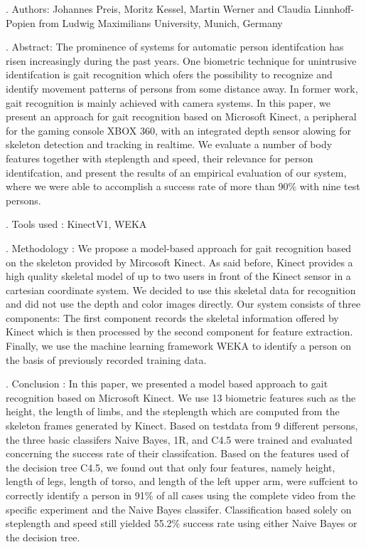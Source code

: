 . Authors:
\noindent Johannes Preis, Moritz Kessel, Martin Werner and Claudia Linnhoff-Popien from Ludwig Maximilians University, Munich, Germany

. Abstract:
\noindent The prominence of systems for automatic person identifcation has risen increasingly during the past years. One biometric technique for unintrusive identifcation is gait recognition which ofers the possibility to recognize and
identify movement patterns of persons from some distance away. In former work, gait recognition is mainly achieved with camera systems. In this paper, we present an approach for gait recognition based on Microsoft Kinect, a peripheral for the gaming console XBOX 360, with an integrated depth
sensor alowing for skeleton detection and tracking in realtime. We evaluate a number of body features together with steplength and speed, their relevance for person identifcation, and present the results of an empirical evaluation of our system, where we were able to accomplish a success rate of more than 90\% with nine test persons.

. Tools used :
\noindent KinectV1, WEKA 

. Methodology :
\noindent We propose a model-based approach for gait recognition based on the skeleton provided by Mircosoft Kinect. As said before, Kinect provides a high quality skeletal model of up to two users in front of the Kinect sensor in a cartesian coordinate system. We decided to use this skeletal data for recognition and did not use the depth and color images directly. Our system consists of three components: The first component records the skeletal information offered by Kinect which is then processed by the second component for feature extraction. Finally, we use the machine learning framework WEKA to identify a person on the basis of previously recorded training data.

. Conclusion :
\noindent In this paper, we presented a model based approach to gait recognition based on Microsoft Kinect. We use 13 biometric features such as the height, the length of limbs, and the steplength which are computed from the skeleton frames generated by Kinect. Based on testdata from 9 different persons, the three basic classifers Naive Bayes, 1R, and C4.5 were trained and evaluated concerning the success rate of their classifcation. Based on the features used of the decision tree C4.5, we found out that only four features, namely height, length of legs, length of torso, and length of the left upper arm, were suffcient to correctly identify a person in 91\% of all cases using the complete video from the specific experiment and the Naive Bayes classifer. Classification based solely on steplength and speed still yielded 55.2\% success rate using either Naive Bayes or the decision tree.
